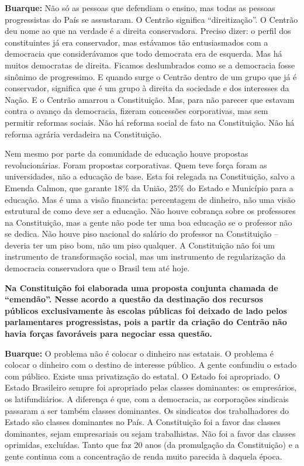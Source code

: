 \textbf{Buarque:} Não só as pessoas que defendiam o ensino, mas todas as
pessoas progressistas do País se assustaram. O Centrão significa
``direitização''. O Centrão deu nome ao que na verdade é a direita
conservadora. Preciso dizer: o perfil dos constituintes já era
conservador, mas estávamos tão entusiasmados com a democracia que
considerávamos que todo democrata era de esquerda. Mas há muitos
democratas de direita. Ficamos deslumbrados como se a democracia fosse
sinônimo de progressimo. E quando surge o Centrão dentro de um grupo que
já é conservador, significa que é um grupo à direita da sociedade e dos
interesses da Nação. E o Centrão amarrou a Constituição. Mas, para não
parecer que estavam contra o avanço da democracia, fizeram concessões
corporativas, mas sem permitir reformas sociais. Não há reforma social
de fato na Constituição. Não há reforma agrária verdadeira na
Constituição.

Nem mesmo por parte da comunidade de educação houve propostas
revolucionárias. Foram propostas corporativas. Quem teve força foram as
universidades, não a educação de base. Esta foi relegada na
Constituição, salvo a Emenda Calmon, que garante 18\% da União, 25\% do
Estado e Município para a educação. Mas é uma a visão financista:
percentagem de dinheiro, não uma visão estrutural de como deve ser a
educação. Não houve cobrança sobre os professores na Constituição, mas a
gente não pode ter uma boa educação se o professor não se dedica. Não
houve piso nacional do salário do professor na Constituição -- deveria
ter um piso bom, não um piso qualquer. A Constituição não foi um
instrumento de transformação social, mas um instrumento de regularização
da democracia conservadora que o Brasil tem até hoje.

\textbf{Na Constituição foi elaborada uma proposta conjunta chamada de
``emendão''. Nesse acordo a questão da destinação dos recursos públicos
exclusivamente às escolas públicas foi deixado de lado pelos
parlamentares progressistas, pois a partir da criação do Centrão não
havia forças favoráveis para negociar essa questão.}

\textbf{Buarque:} O problema não é colocar o dinheiro nas estatais. O
problema é colocar o dinheiro com o destino de interesse público. A
gente confundiu o estado com público. Existe uma privatização do
estatal. O Estado foi apropriado. O Estado Brasileiro sempre foi
apropriado pelas classes dominantes: os empresários, os latifundiários.
A diferença é que, com a democracia, as corporações sindicais passaram a
ser também classes dominantes. Os sindicatos dos trabalhadores do Estado
são classes dominantes no País. A Constituição foi a favor das classes
dominantes, sejam empresariais ou sejam trabalhistas. Não foi a favor
das classes oprimidas, excluídas. Tanto que faz 20 anos (da promulgação
da Constituição) e a gente continua com a concentração de renda muito
parecida à daquela época.

